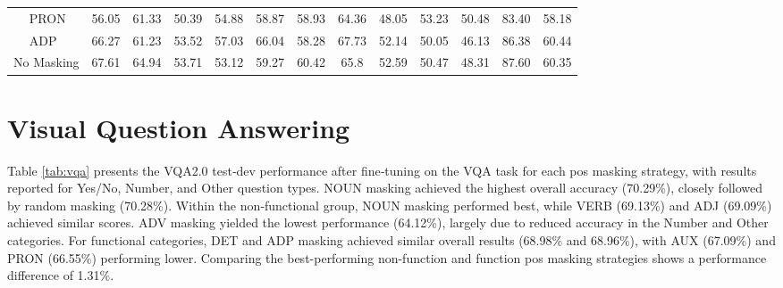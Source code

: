 \begin{table}[H]
\begin{adjustbox}{width=1\textwidth}
\begin{tabular}{ll|c|c|ccc|c|cc|cc|c|c}
            & PRON & 56.05 & 61.33 & 50.39 & 54.88 & 58.87 & 58.93 & 64.36 & 48.05 & \cellcolor{green}53.23 & \cellcolor{yellow}50.48 & 83.40 & 58.18 \\
            & ADP & \cellcolor{yellow}66.27 & 61.23 & 53.52 & 57.03 & 66.04 & 58.28 & 67.73 & \cellcolor{green}52.14 & 50.05 & 46.13 & \cellcolor{yellow}86.38 & \cellcolor{yellow}60.44 \\
            \hline
            \multicolumn{2}{c|}{No Masking} & 67.61 & 64.94 & 53.71 & 53.12 & 59.27 & 60.42 & 65.8 & 52.59 & 50.47 & 48.31 & 87.60 & 60.35 \\
            \hline
        \end{tabular}
    \end{adjustbox}
\end{table}

\section{Visual Question Answering}
Table \ref{tab:vqa} presents the VQA2.0 test‐dev performance after fine‐tuning on the VQA task for each \acrshort{pos} masking strategy, with results reported for Yes/No, Number, and Other question types.
NOUN masking achieved the highest overall accuracy (70.29\%), closely followed by random masking (70.28\%).
Within the non‐functional group, NOUN masking performed best, while VERB (69.13\%) and ADJ (69.09\%) achieved similar scores. ADV masking yielded the lowest performance (64.12\%), largely due to reduced accuracy in the Number and Other categories.
For functional categories, DET and ADP masking achieved similar overall results (68.98\% and 68.96\%), with AUX (67.09\%) and PRON (66.55\%) performing lower.
Comparing the best-performing non-function and function \acrshort{pos} masking strategies shows a performance difference of 1.31\%.

